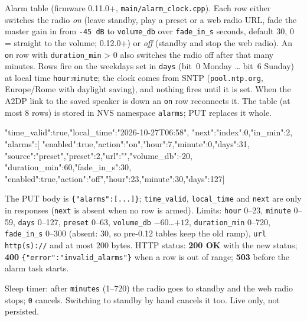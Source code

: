 \label{sec:api-alarms}

Alarm table (firmware 0.11.0+, \texttt{main/alarm\_clock.cpp}). Each row
either switches the radio \emph{on} (leave standby, play a preset or a web
radio URL, fade the master gain in from \texttt{-45 dB} to
\texttt{volume\_db} over \texttt{fade\_in\_s} seconds, default 30, 0 =
straight to the volume; 0.12.0+) or \emph{off} (standby and stop the web
radio). An \texttt{on} row with \texttt{duration\_min} > 0 also switches
the radio off after that many minutes. Rows fire on the weekdays set in
\texttt{days} (bit~0 Monday \ldots{} bit~6 Sunday) at local time
\texttt{hour}:\texttt{minute}; the clock comes from SNTP
(\texttt{pool.ntp.org}, Europe/Rome with daylight saving), and nothing
fires until it is set. When the A2DP link to the saved speaker is down an
\texttt{on} row reconnects it. The table (at most 8 rows) is stored in NVS
namespace \texttt{alarms}; PUT replaces it whole.

\begin{drnote}
\begin{drcode}[JSON]
{"time_valid":true,"local_time":"2026-10-27T06:58",
 "next":{"index":0,"in_min":2},
 "alarms":[
  {"enabled":true,"action":"on","hour":7,"minute":0,"days":31,
   "source":"preset","preset":2,"url":"","volume_db":-20,
   "duration_min":60,"fade_in_s":30},
  {"enabled":true,"action":"off","hour":23,"minute":30,"days":127}]}
\end{drcode}
\end{drnote}

The PUT body is \texttt{\{"alarms":[...]\}}; \texttt{time\_valid},
\texttt{local\_time} and \texttt{next} are only in responses
(\texttt{next} is absent when no row is armed). Limits: \texttt{hour}
0--23, \texttt{minute} 0--59, \texttt{days} 0--127, \texttt{preset} 0--63,
\texttt{volume\_db} $-60$\ldots$+12$, \texttt{duration\_min} 0--720,
\texttt{fade\_in\_s} 0--300 (absent: 30, so pre-0.12 tables keep the old
ramp),
\texttt{url} \texttt{http(s)://} and at most 200 bytes. HTTP status:
\textbf{200 OK} with the new status; \textbf{400}
\texttt{\{"error":"invalid\_alarms"\}} when a row is out of range;
\textbf{503} before the alarm task starts.

\label{sec:api-system-sleep}

Sleep timer: after \texttt{minutes} (1--720) the radio goes to standby and
the web radio stops; \texttt{0} cancels. Switching to standby by hand
cancels it too. Live only, not persisted.

